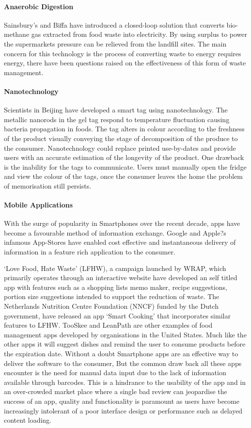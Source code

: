 \documentclass[a4paper, 11pt]{article}
\begin{document}
\paragraph{Anaerobic Digestion}
Sainsbury's and Biffa have introduced a closed-loop solution that converts bio-methane gas extracted from food waste into electricity. By using surplus to power the supermarkets pressure can be relieved from the landfill sites. The main concern for this technology is the process of converting waste to energy requires energy, there have been questions raised on the effectiveness of this form of waste management.\cite{anarobic} 

\paragraph{Nanotechnology}
Scientists in Beijing have developed a smart tag using nanotechnology. The metallic nanorods in the gel tag respond to temperature fluctuation causing bacteria propagation in foods. The tag alters in colour according to the freshness of the product visually conveying the stage of decomposition of the produce to the consumer. Nanotechnology could replace printed use-by-dates and provide users with an accurate estimation of the longevity of the product. One drawback is the inability for the tags to communicate. Users must manually open the fridge and view the colour of the tags, once the consumer leaves the home the problem of memorisation still persists.\cite{FoodWaste}

\paragraph{Mobile Applications}
With the surge of popularity in Smartphones over the recent decade, apps have become a favourable method of information exchange. Google and Apple?s infamous App-Stores have enabled cost effective and instantaneous delivery of information in a feature rich application to the consumer.

`Love Food, Hate Waste' (LFHW), a campaign launched by WRAP, which primarily operates through an interactive website have developed an self titled app with features such as a shopping lists memo maker, recipe suggestions, portion size suggestions intended to support the reduction of waste. The Netherlands Nutrition Centre Foundation (NNCF) funded by the Dutch government, have released an app `Smart Cooking' that incorporates similar features to LFHW. TooSkee and LeanPath\cite{FoodWaste} are other examples of food management apps developed by organisations in the United States. Much like the other apps it will suggest dishes and remind the user to consume products before the expiration date. Without a doubt Smartphone apps are an effective way to deliver the software to the consumer, But the common draw back all these apps encounter is the need for manual data input due to the lack of information available through barcodes. This is a hindrance to the usability of the app and in an over-crowded market place where a single bad review can jeopardise the success of an app, quality and functionality is paramount as users have become increasingly intolerant of a poor interface design or performance such as delayed content loading.
\end{document}
